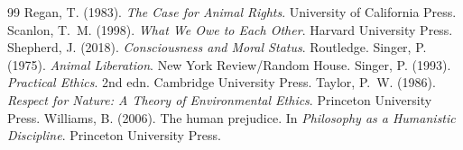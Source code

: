 \documentclass{situationist-preprint}
\begin{document}
\begin{thebibliography}{99}
 Regan, T. (1983). \emph{The Case for Animal Rights}. University of California Press.
 Scanlon, T.~M. (1998). \emph{What We Owe to Each Other}. Harvard University Press.
 Shepherd, J. (2018). \emph{Consciousness and Moral Status}. Routledge.
 Singer, P. (1975). \emph{Animal Liberation}. New York Review/Random House.
 Singer, P. (1993). \emph{Practical Ethics}. 2nd edn. Cambridge University Press.
 Taylor, P.~W. (1986). \emph{Respect for Nature: A Theory of Environmental Ethics}. Princeton University Press.
 Williams, B. (2006). The human prejudice. In \emph{Philosophy as a Humanistic Discipline}. Princeton University Press.
\end{thebibliography}
\end{document}
